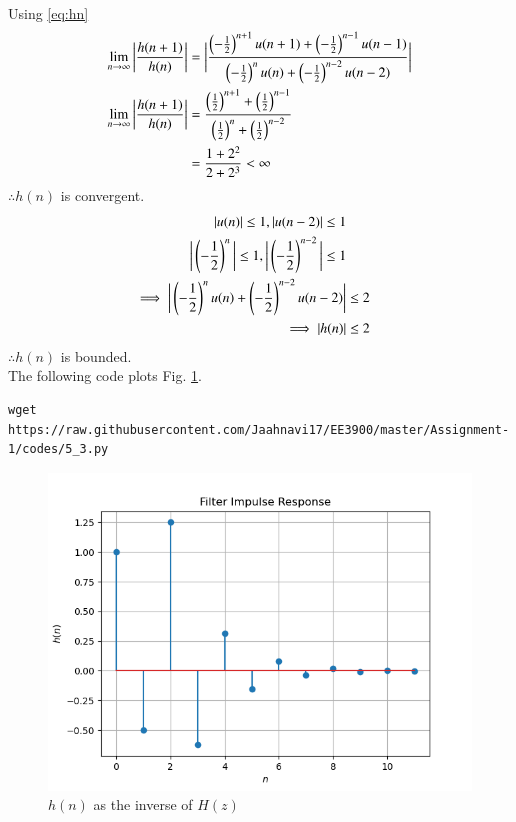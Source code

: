 \documentclass[journal,12pt,twocolumn]{IEEEtran}
\renewcommand\thesection{\arabic{section}}
\begin{document}
\begin{enumerate}[label=\thesection.\arabic*]
\\
\solution 
Using \eqref{eq:hn}
\begin{align}
    \lim_{n \rightarrow{}\infty}\bigg| \frac{h(n+1)}{h(n)}\bigg|&=\bigg|\frac{\left(-\frac{1}{2}\right)^{n+1}u(n+1) + \left(-\frac{1}{2}\right)^{n-1}u(n-1)}{\left(-\frac{1}{2}\right)^{n}u(n) + \left(-\frac{1}{2}\right)^{n-2}u(n-2)}\bigg|\\
    \lim_{n \rightarrow{}\infty} \bigg| \frac{h(n+1)}{h(n)}\bigg|&= \frac{\left(\frac{1}{2}\right)^{n+1} + \left(\frac{1}{2}\right)^{n-1}}{\left(\frac{1}{2}\right)^{n} + \left(\frac{1}{2}\right)^{n-2}}\\
    &= \frac{1+2^{2}}{2+2^3}<\infty
\end{align}
$\therefore h(n)$ is convergent.\\
\begin{align*}
    |u(n)|\leq1, |u(n-2)|\leq1\\
    \bigg|\left(-\frac{1}{2}\right)^n \bigg|\leq1,\bigg|\left(-\frac{1}{2}\right)^{n-2} \bigg|\leq1\\ 
    \implies \bigg|\left(-\frac{1}{2}\right)^{n}u(n) + \left(-\frac{1}{2}\right)^{n-2}u(n-2)\bigg|&\leq2\\
    \implies |h(n)|&\leq2
\end{align*}
$\therefore h(n)$ is bounded.\\
The following code plots Fig. \ref{fig:hn}.
\begin{lstlisting}
wget https://raw.githubusercontent.com/Jaahnavi17/EE3900/master/Assignment-1/codes/5_3.py
\end{lstlisting}
\begin{figure}[!ht]
\centering
\includegraphics[width=\columnwidth]{figures/Figure_3.png}
\caption{$h(n)$ as the inverse of $H(z)$}
\label{fig:hn}
\end{figure}


\end{enumerate}
\end{document}
